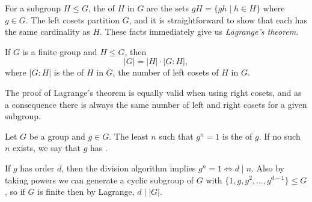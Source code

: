 For a subgroup $H \leq G$, the  of $H$ in $G$ are the sets $gH = \{gh \mid h \in H \}$ where $g \in G$. 
The left cosets partition $G$, and it is straightforward to show that each has the same cardinality as $H$. 
These facts immediately give us \emph{Lagrange's theorem}.

\begin{theorem}
  If $G$ is a finite group and $H \leq G$, then
  $$
|G| = |H| \cdot |G : H|,
  $$
  where $|G:H|$ is the  of $H$ in $G$, the number of left cosets of $H$ in $G$.
\end{theorem}

\begin{remark}
  The proof of Lagrange's theorem is equally valid when using right cosets, and as a consequence there is always the same number of left and right cosets for a given subgroup.
\end{remark}




\begin{definition}
	Let $G$ be a group and $g \in G$. 
  The least $n$ such that $g^n = 1$ is the  of $g$. If no such $n$ exists, we say that $g$ has .
\end{definition}

\begin{remark} 
If $g$ has order $d$, then the division algorithm implies $g^n = 1 \iff d \mid n$. Also by taking powers we can generate a cyclic subgroup of $G$ with $\{1, g, g^2, \dots, g^{d - 1}\} \leq G$, so if $G$ is finite then by Lagrange, $d \mid |G|$.
\end{remark}



